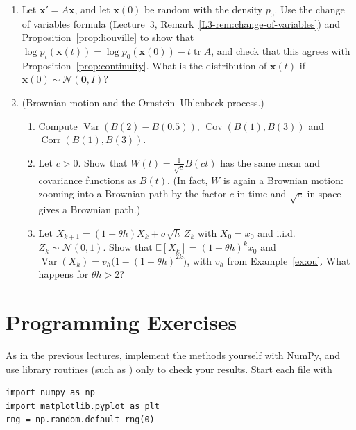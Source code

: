 \documentclass[11pt]{article}
\newcommand{\py}[1]{\texttt{\detokenize{#1}}}
\newcommand{\E}{\mathbb{E}}
\DeclareMathOperator{\Var}{Var}
\DeclareMathOperator{\Cov}{Cov}
\DeclareMathOperator{\Corr}{Corr}
\theoremstyle{definition}
\theoremstyle{plain}
\theoremstyle{remark}
\DeclareMathOperator{\tr}{tr}
\begin{document}
\begin{enumerate}[leftmargin=*]
    \item Let $\mathbf{x}' = A\mathbf{x}$, and let $\mathbf{x}(0)$ be random with the density $p_0$. Use the change of variables formula (Lecture~3, Remark~\ref{L3-rem:change-of-variables}) and Proposition~\ref{prop:liouville} to show that $\log p_t(\mathbf{x}(t)) = \log p_0(\mathbf{x}(0)) - t\tr A$, and check that this agrees with Proposition~\ref{prop:continuity}. What is the distribution of $\mathbf{x}(t)$ if $\mathbf{x}(0) \sim \mathcal{N}(\mathbf{0}, I)$?
    \item (Brownian motion and the Ornstein--Uhlenbeck process.)
    \begin{enumerate}[label=(\alph*)]
        \item Compute $\Var(B(2) - B(0.5))$, $\Cov(B(1), B(3))$ and $\Corr(B(1), B(3))$.
        \item Let $c > 0$. Show that $W(t) = \frac{1}{\sqrt{c}}B(ct)$ has the same mean and covariance functions as $B(t)$. (In fact, $W$ is again a Brownian motion: zooming into a Brownian path by the factor $c$ in time and $\sqrt{c}$ in space gives a Brownian path.)
        \item Let $X_{k+1} = (1 - \theta h)X_k + \sigma\sqrt{h}\,Z_k$ with $X_0 = x_0$ and i.i.d.\ $Z_k \sim \mathcal{N}(0, 1)$. Show that $\E[X_k] = (1 - \theta h)^kx_0$ and $\Var(X_k) = v_h\big(1 - (1 - \theta h)^{2k}\big)$, with $v_h$ from Example~\ref{ex:ou}. What happens for $\theta h > 2$?
    \end{enumerate}
\end{enumerate}

\section{Programming Exercises}\label{sec:programming}

\setlength{\emergencystretch}{3em}

As in the previous lectures, implement the methods yourself with NumPy, and use library routines (such as \py{scipy.integrate.solve_ivp}) only to check your results. Start each file with
\begin{lstlisting}
import numpy as np
import matplotlib.pyplot as plt
rng = np.random.default_rng(0)
\end{lstlisting}
\end{document}
